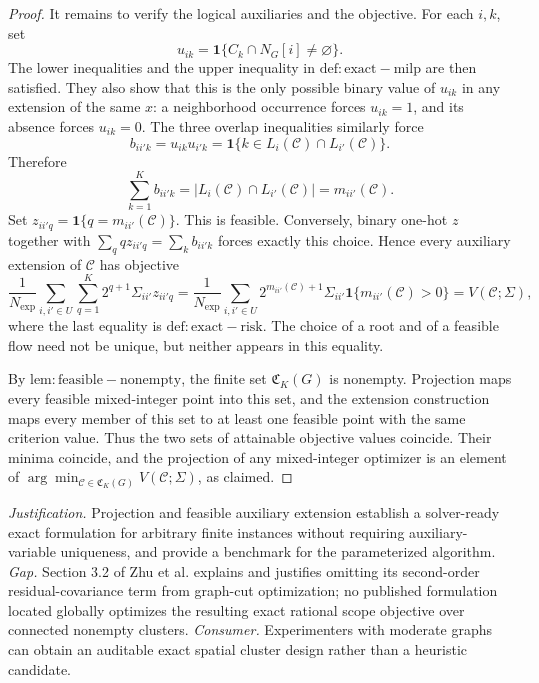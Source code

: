 \documentclass{article}
\begin{document}
\begin{proof}
It remains to verify the logical auxiliaries and the objective.  For each \(i,k\), set
\[
 u_{ik}=\mathbf 1\{C_k\cap N_G[i]\ne\varnothing\}.
\]
The lower inequalities and the upper inequality in \(\mathrm{def:exact-milp}\) are then satisfied.  They also show that this is the only possible binary value of \(u_{ik}\) in any extension of the same \(x\): a neighborhood occurrence forces \(u_{ik}=1\), and its absence forces \(u_{ik}=0\).  The three overlap inequalities similarly force
\[
 b_{ii'k}=u_{ik}u_{i'k}
 =\mathbf 1\{k\in L_i(\mathcal C)\cap L_{i'}(\mathcal C)\}.
\]
Therefore
\[
 \sum_{k=1}^K b_{ii'k}=|L_i(\mathcal C)\cap L_{i'}(\mathcal C)|
 =m_{ii'}(\mathcal C).
\]
Set \(z_{ii'q}=\mathbf 1\{q=m_{ii'}(\mathcal C)\}\).  This is feasible.  Conversely, binary one-hot \(z\) together with \(\sum_qqz_{ii'q}=\sum_kb_{ii'k}\) forces exactly this choice.  Hence every auxiliary extension of \(\mathcal C\) has objective
\[
 \frac1{N_{\exp}}\sum_{i,i'\in U}\sum_{q=1}^K
 2^{q+1}\Sigma_{ii'}z_{ii'q}
 =\frac1{N_{\exp}}\sum_{i,i'\in U}
 2^{m_{ii'}(\mathcal C)+1}\Sigma_{ii'}
 \mathbf 1\{m_{ii'}(\mathcal C)>0\}
 =V(\mathcal C;\Sigma),
\]
where the last equality is \(\mathrm{def:exact-risk}\).  The choice of a root and of a feasible flow need not be unique, but neither appears in this equality.

By \(\mathrm{lem:feasible-nonempty}\), the finite set \(\mathfrak C_K(G)\) is nonempty.  Projection maps every feasible mixed-integer point into this set, and the extension construction maps every member of this set to at least one feasible point with the same criterion value.  Thus the two sets of attainable objective values coincide.  Their minima coincide, and the projection of any mixed-integer optimizer is an element of \(\arg\min_{\mathcal C\in\mathfrak C_K(G)}V(\mathcal C;\Sigma)\), as claimed.
\end{proof}
\par\smallskip\noindent \textit{Justification.} Projection and feasible auxiliary extension establish a solver-ready exact formulation for arbitrary finite instances without requiring auxiliary-variable uniqueness, and provide a benchmark for the parameterized algorithm. \textit{Gap.} Section 3.2 of Zhu et al. explains and justifies omitting its second-order residual-covariance term from graph-cut optimization; no published formulation located globally optimizes the resulting exact rational scope objective over connected nonempty clusters. \textit{Consumer.} Experimenters with moderate graphs can obtain an auditable exact spatial cluster design rather than a heuristic candidate.
\end{document}
